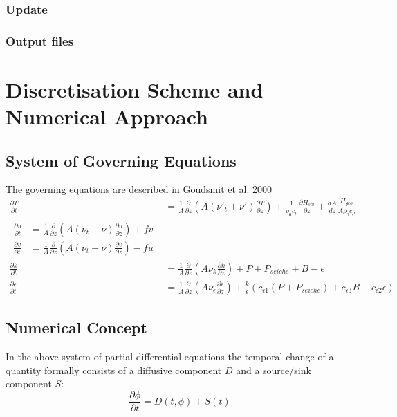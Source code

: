 \documentclass[paper=a4, fontsize=12pt]{article}
\begin{document}
\subsubsection{Update}

\subsubsection{Output files}




\section{Discretisation Scheme and Numerical Approach}
\subsection{System of Governing Equations}
The governing equations are described in Goudsmit et al. 2000
\begin{align}
	\frac{\partial T}{\partial t} &= \frac{1}{A}\frac{\partial}{\partial z}\left(A(\nu'_t + \nu')\frac{\partial T}{\partial z}\right)+\frac{1}{\rho_0 c_p}\frac{\partial H_{sol}}{\partial z}+\frac{dA}{dz}\frac{H_{geo}}{A\rho_0 c_p}\\
	\begin{split}
		\frac{\partial u}{\partial t} &= \frac{1}{A}\frac{\partial}{\partial z}\left(A(\nu_t + \nu)\frac{\partial u}{\partial z}\right) + fv\\
		\frac{\partial v}{\partial t} &= \frac{1}{A}\frac{\partial}{\partial z}\left(A(\nu_t + \nu)\frac{\partial v}{\partial z}\right) - fu
	\end{split}\\
	\frac{\partial k}{\partial t} &= \frac{1}{A}\frac{\partial}{\partial z}\left(A\nu_k\frac{\partial k}{\partial z}\right) + P + P_{seiche} + B - \epsilon\\
	\frac{\partial \epsilon}{\partial t} &= \frac{1}{A}\frac{\partial}{\partial z}\left(A\nu_{\epsilon}\frac{\partial \epsilon}{\partial z}\right) + \frac{k}{\epsilon}\left(c_{\epsilon 1}\left(P+P_{seiche}\right)+c_{\epsilon 3}B-c_{\epsilon 2}\epsilon\right)
\end{align}

\subsection{Numerical Concept}
In the above system of partial differential equations the temporal change of a quantity formally consists of a diffusive component $D$ and a source/sink component $S$:
\begin{equation}
	\frac{\partial\phi}{\partial t} = D(t, \phi) + S(t)
\end{equation}
\end{document}

